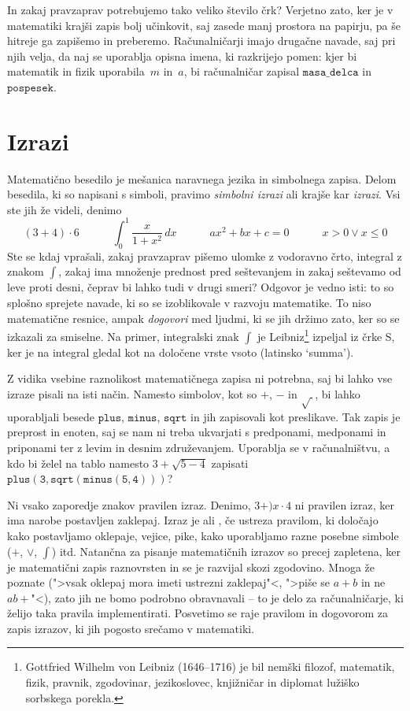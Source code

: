 In zakaj pravzaprav potrebujemo tako veliko število črk? Verjetno zato, ker je v
matematiki krajši zapis bolj učinkovit, saj zasede manj prostora na papirju, pa še hitreje
ga zapišemo in preberemo. Računalničarji imajo drugačne navade, saj pri njih velja, da naj
se uporablja opisna imena, ki razkrijejo pomen: kjer bi matematik in fizik uporabila~$m$
in~$a$, bi računalničar zapisal $\mathtt{masa\_delca}$ in $\mathtt{pospesek}$.

\section{Izrazi}
\label{sec:irazi}

Matematično besedilo je mešanica naravnega jezika in simbolnega zapisa. Delom besedila, ki
so napisani s simboli, pravimo \emph{simbolni izrazi} ali krajše kar \emph{izrazi}. Vsi
ste jih že videli, denimo
%
\begin{equation*}
  (3 + 4) \cdot 6 \qquad\quad
  \int_0^1 \frac{x}{1 + x^2} \, dx \qquad\quad
  a x^2 + b x + c = 0 \qquad\quad
  x > 0 \lor x \leq 0
\end{equation*}
%
Ste se kdaj vprašali, zakaj pravzaprav pišemo ulomke z vodoravno črto, integral z znakom
$\int$, zakaj ima množenje prednost pred seštevanjem in zakaj seštevamo od leve proti
desni, čeprav bi lahko tudi v drugi smeri? Odgovor je vedno isti: to so splošno sprejete
navade, ki so se izoblikovale v razvoju matematike. To niso matematične resnice, ampak
\emph{dogovori} med ljudmi, ki se jih držimo zato, ker so se izkazali za smiselne. Na
primer, integralski znak $\int$ je Leibniz\footnote{Gottfried Wilhelm von Leibniz
  (1646--1716) je bil nemški filozof, matematik, fizik, pravnik, zgodovinar, jezikoslovec,
  knjižničar in diplomat lužiško sorbskega porekla.} izpeljal iz črke S, ker je na
integral gledal kot na določene vrste vsoto (latinsko `summa').

Z vidika vsebine raznolikost matematičnega zapisa ni potrebna, saj bi lahko vse izraze
pisali na isti način. Namesto simbolov, kot so $+$, $-$ in $\sqrt{\ }$, bi lahko
uporabljali besede $\mathtt{plus}$, $\mathtt{minus}$, $\mathtt{sqrt}$ in jih zapisovali
kot preslikave. Tak zapis je preprost in enoten, saj se nam ni treba ukvarjati s
predponami, medponami in priponami ter z levim in desnim združevanjem. Uporablja se v
računalništvu, a kdo bi želel na tablo namesto $3 + \sqrt{5 - 4}$ zapisati
$\mathtt{plus(3, \mathtt{sqrt}(\mathtt{minus}(5, 4)))}$?

Ni vsako zaporedje znakov pravilen izraz. Denimo, $3 + ) x \cdot 4$ ni pravilen izraz, ker ima narobe postavljen zaklepaj.
%
Izraz je  ali , če ustreza pravilom, ki določajo kako postavljamo oklepaje, vejice, pike, kako uporabljamo razne posebne simbole ($+$, $\lor$, $\int$) itd.
%
Natančna  za pisanje matematičnih izrazov so precej zapletena, ker je matematični zapis raznovrsten
in se je razvijal skozi zgodovino. Mnoga že poznate (">vsak oklepaj mora imeti ustrezni zaklepaj"<, ">piše se $a + b$ in ne $a b +$"<), zato jih ne bomo podrobno obravnavali -- to je delo za računalničarje, ki želijo taka pravila implementirati. Posvetimo se raje pravilom in dogovorom za zapis izrazov, ki jih pogosto srečamo v matematiki.

